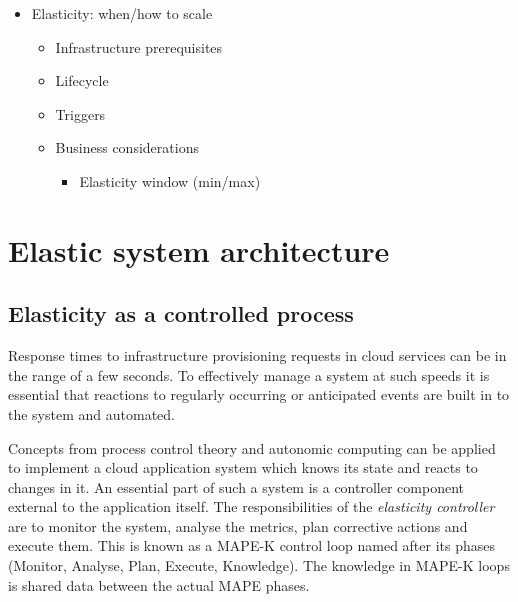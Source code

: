 \documentclass[english]{tktltiki2}
\theoremstyle{definition}
\theoremstyle{remark}
\begin{document}

\begin{itemize}
\item Elasticity: when/how to scale
	\begin{itemize}
	\item Infrastructure prerequisites
	\item Lifecycle
	\item Triggers
	\item Business considerations
		\begin{itemize}
		\item Elasticity window (min/max)
		\end{itemize}
	\end{itemize}
\end{itemize}


\section{Elastic system architecture}  
\label{sec:elasticarchitectures}



\subsection{Elasticity as a controlled process}
\label{elasticity_as_a_controlled_process}

Response times to infrastructure provisioning requests in cloud services can be
in the range of a few seconds. To effectively manage a system at such speeds it
is essential that reactions to regularly occurring or anticipated events are
built in to the system and automated.

Concepts from process control theory and autonomic computing can be applied to
implement a cloud application system which knows its state and reacts to changes
in it. An essential part of such a system is a controller component external to
the application itself. The responsibilities of the \emph{elasticity controller}
are to monitor the system, analyse the metrics, plan corrective actions and
execute them. This is known as a MAPE-K control loop  named
after its phases (Monitor, Analyse, Plan, Execute, Knowledge). The knowledge in
MAPE-K loops is shared data between the actual MAPE phases.
\end{document}
